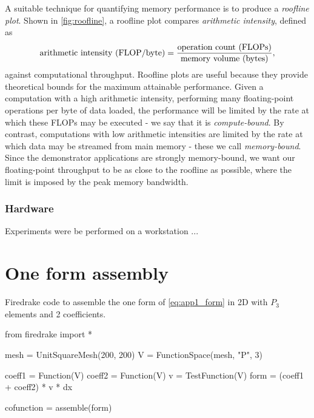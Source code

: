 \documentclass[thesis]{subfiles}
\begin{document}
A suitable technique for quantifying memory performance is to produce a \emph{roofline plot}.
Shown in \cref{fig:roofline}, a roofline plot compares \emph{arithmetic intensity}, defined as
\begin{equation*}
  \textnormal{arithmetic intensity (FLOP/byte)} = \frac{\textnormal{operation count (FLOPs)}}{\textnormal{memory volume (bytes)}},
\end{equation*}
against computational throughput.
Roofline plots are useful because they provide theoretical bounds for the maximum attainable performance.
Given a computation with a high arithmetic intensity, performing many floating-point operations per byte of data loaded, the performance will be limited by the rate at which these FLOPs may be executed - we say that it is \emph{compute-bound}.
By contrast, computations with low arithmetic intensities are limited by the rate at which data may be streamed from main memory - these we call \emph{memory-bound}.
Since the demonstrator applications are strongly memory-bound, we want our floating-point throughput to be as close to the roofline as possible, where the limit is imposed by the peak memory bandwidth.

\subsubsection{Hardware}

Experiments were be performed on a workstation ...



\section{One form assembly}



\begin{listing}
  \centering
  \caption{
    Firedrake code to assemble the one form of \cref{eq:app1_form} in 2D with $P_3$ elements and 2 coefficients.
  }
  \begin{minipage}{.9\textwidth}
    \begin{pyalg2}
      from firedrake import *

      mesh = UnitSquareMesh(200, 200)
      V = FunctionSpace(mesh, "P", 3)

      coeff1 = Function(V)
      coeff2 = Function(V)
      v = TestFunction(V)
      form = (coeff1 + coeff2) * v * dx

      cofunction = assemble(form)
    \end{pyalg2}
  \end{minipage}
  \label{listing:app1_code}
\end{listing}
\end{document}
